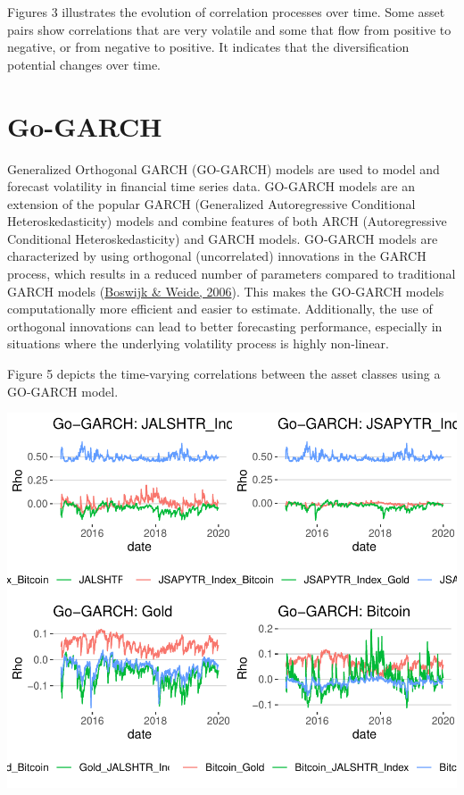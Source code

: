 \documentclass[11pt,preprint, authoryear]{elsarticle}
\numberwithin{equation}{section}
\numberwithin{figure}{section}
\numberwithin{table}{section}
\begin{document}
Figures 3 illustrates the evolution of correlation processes over time.
Some asset pairs show correlations that are very volatile and some that
flow from positive to negative, or from negative to positive. It
indicates that the diversification potential changes over time.

\hypertarget{go-garch}{%
\section{Go-GARCH}\label{go-garch}}

Generalized Orthogonal GARCH (GO-GARCH) models are used to model and
forecast volatility in financial time series data. GO-GARCH models are
an extension of the popular GARCH (Generalized Autoregressive
Conditional Heteroskedasticity) models and combine features of both ARCH
(Autoregressive Conditional Heteroskedasticity) and GARCH models.
GO-GARCH models are characterized by using orthogonal (uncorrelated)
innovations in the GARCH process, which results in a reduced number of
parameters compared to traditional GARCH models
(\protect\hyperlink{ref-boswijk2006wake}{Boswijk \& Weide, 2006}). This
makes the GO-GARCH models computationally more efficient and easier to
estimate. Additionally, the use of orthogonal innovations can lead to
better forecasting performance, especially in situations where the
underlying volatility process is highly non-linear.

Figure 5 depicts the time-varying correlations between the asset classes
using a GO-GARCH model.

\includegraphics{FinMetrics-Essay_files/figure-latex/unnamed-chunk-10-1.pdf}
\end{document}
